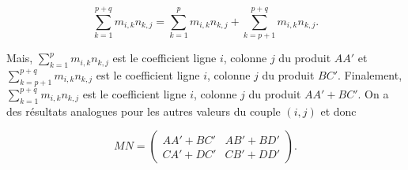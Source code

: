 {\begin{enumerate}
{$$\sum_{k=1}^{p+q}m_{i,k}n_{k,j}=\sum_{k=1}^{p}m_{i,k}n_{k,j}+\sum_{k=p+1}^{p+q}m_{i,k}n_{k,j}.$$

Mais, $\sum_{k=1}^{p}m_{i,k}n_{k,j}$ est le coefficient ligne $i$, colonne $j$ du produit $AA'$ et $\sum_{k=p+1}^{p+q}m_{i,k}n_{k,j}$ est le coefficient ligne $i$, colonne $j$ du produit $BC'$. Finalement, $\sum_{k=1}^{p+q}m_{i,k}n_{k,j}$ est le coefficient ligne $i$, colonne $j$ du produit $AA'+BC'$. On a des résultats analogues pour les autres valeurs du couple $(i,j)$ et donc

$$MN=\left(
\begin{array}{cc}
AA'+BC'&AB'+BD'\\
CA'+DC'&CB'+DD'
\end{array}
\right).$$}
\end{enumerate}
}
